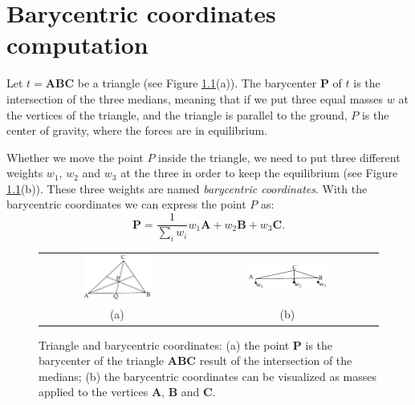 
\chapter[Barycentric coordinates computation]{Barycentric coordinates \\computation}
\label{app:barycentric_}

Let $\mathit{t} = \mathbf{A}\mathbf{B}\mathbf{C}$ be a triangle (see Figure \ref{fig:bar}(a)). 
The barycenter $\mathbf{P}$ of $t$ is the intersection of the three medians, meaning that if we put three equal masses $w$ at the vertices of the triangle, and the triangle is parallel to the ground, $P$ is the center of gravity, where the forces are in equilibrium.

Whether we move the point $P$ inside the triangle, we need to put three different weights $w_1$, $w_2$ and $w_3$ at the three in order to keep the equilibrium (see Figure \ref{fig:bar}(b)). 
These three weights are named \emph{barycentric coordinates}.
With the barycentric coordinates we can express the point $P$ as:
\begin{equation}
\label{eq:bar_mass}
 \mathbf{P} = \frac{1}{\sum_i w_i}  w_1 \mathbf{A} + w_2 \mathbf{B} + w_3 \mathbf{C}.
\end{equation}

\begin{figure}[bt]
 \begin{tabular}{cc}
  \includegraphics[width=0.45\textwidth]{./img/ch-appendix/barycentric01}&
  \includegraphics[width=0.45\textwidth]{./img/ch-appendix/barycentric02}\\
  (a)&(b)
 \end{tabular}
 \caption{Triangle and barycentric coordinates: 
 (a) the point $\mathbf{P}$ is the barycenter of the triangle 
 $\mathbf{ABC}$ result of the intersection of the medians; 
 (b) the barycentric coordinates can be visualized as masses applied to the vertices $\mathbf{A}$, $\mathbf{B}$ and $\mathbf{C}$.
 }
 \label{fig:bar}
\end{figure}

